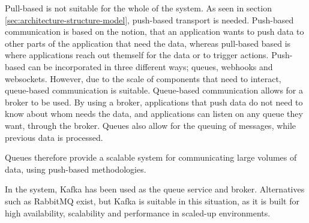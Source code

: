Pull-based is not suitable for the whole of the system. As seen in section \ref{sec:architecture-structure-model}, push-based transport is needed.
Push-based communication is based on the notion, that an application wants to push data to other parts of the application that need the data, whereas pull-based based is where applications reach out themself for the data or to trigger actions.
Push-based can be incorporated in three different ways; queues, webhooks and websockets.
However, due to the scale of components that need to interact, queue-based communication is suitable. Queue-based communication allows for a broker to be used. By using a broker, applications that push data do not need to know about whom needs the data, and applications can listen on any queue they want, through the broker. 
Queues also allow for the queuing of messages, while previous data is processed.

Queues therefore provide a scalable system for communicating large volumes of data, using push-based methodologies.

In the system, Kafka has been used as the queue service and broker. Alternatives such as RabbitMQ exist, but Kafka is suitable in this situation, as it is built for high availability, scalability and performance in scaled-up environments.










